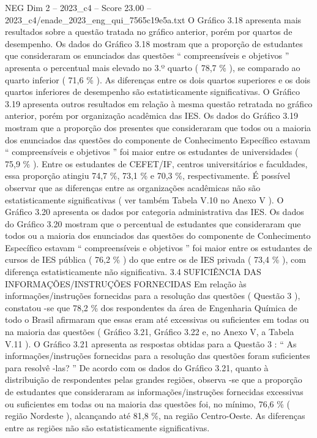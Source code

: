 \begin{textsample}{NEG Dim 2 – 2023\_c4 – Score 23.00 – 2023\_c4/enade\_2023\_eng\_qui\_7565c19e5a.txt}
O Gráfico 3.18 apresenta mais resultados sobre a questão tratada no gráfico anterior, porém por quartos de desempenho.
Os dados do Gráfico 3.18 mostram que a proporção de estudantes que consideraram os enunciados das questões “ compreensíveis e objetivos ” apresenta o percentual mais elevado no 3.º quarto ( 78,7 \% ), se comparado ao quarto inferior ( 71,6 \% ).
As diferenças entre os dois quartos superiores e os dois quartos inferiores de desempenho são estatisticamente significativas.
O Gráfico 3.19 apresenta outros resultados em relação à mesma questão retratada no gráfico anterior, porém por organização acadêmica das IES.
Os dados do Gráfico 3.19 mostram que a proporção dos presentes que consideraram que todos ou a maioria dos enunciados das questões do componente de Conhecimento Específico estavam “ compreensíveis e objetivos ” foi maior entre os estudantes de universidades ( 75,9 \% ).
Entre os estudantes de CEFET/IF, centros universitários e faculdades, essa proporção atingiu 74,7 \%, 73,1 \% e 70,3 \%, respectivamente.
É possível observar que as diferenças entre as organizações acadêmicas não são estatisticamente significativas ( ver também Tabela V.10 no Anexo V ).
O Gráfico 3.20 apresenta os dados por categoria administrativa das IES.
Os dados do Gráfico 3.20 mostram que o percentual de estudantes que consideraram que todos ou a maioria dos enunciados das questões do componente de Conhecimento Específico estavam “ compreensíveis e objetivos ” foi maior entre os estudantes de cursos de IES pública ( 76,2 \% ) do que entre os de IES privada ( 73,4 \% ), com diferença estatisticamente não significativa. 3.4 SUFICIÊNCIA DAS INFORMAÇÕES/INSTRUÇÕES FORNECIDAS Em relação às informações/instruções fornecidas para a resolução das questões ( Questão 3 ), constatou -se que 78,2 \% dos respondentes da área de Engenharia Química de todo o Brasil afirmaram que essas eram até excessivas ou suficientes em todas ou na maioria das questões ( Gráfico 3.21, Gráfico 3.22 e, no Anexo V, a Tabela V.11 ).
O Gráfico 3.21 apresenta as respostas obtidas para a Questão 3 : “ As informações/instruções fornecidas para a resolução das questões foram suficientes para resolvê -las? ” De acordo com os dados do Gráfico 3.21, quanto à distribuição de respondentes pelas grandes regiões, observa -se que a proporção de estudantes que consideraram as informações/instruções fornecidas excessivas ou suficientes em todas ou na maioria das questões foi, no mínimo, 76,6 \% ( região Nordeste ), alcançando até 81,8 \%, na região Centro-Oeste.
As diferenças entre as regiões não são estatisticamente significativas.

\end{textsample}

